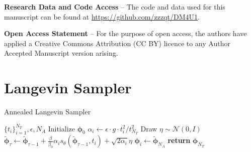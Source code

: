 \documentclass[a4paper,11pt]{article}
\newcommand{\el}{\vspace*{0.2cm}}
\begin{document}
\el\noindent
{\bf Research Data and Code Access} --
The code and data used for this manuscript can be found at \url{https://github.com/zzzqt/DM4U1}.

\el\noindent
{\bf Open Access Statement} -- For the purpose of open access, the authors have applied a Creative Commons Attribution (CC BY) licence to any Author Accepted Manuscript version arising.




\newpage
\appendix


\section{Langevin Sampler}
\label{app:langevin}

\begin{algorithm}[hbtp!]
\caption{Annealed Langevin Sampler}
\label{alg:annealed-langevin}
\begin{algorithmic}[1] 
    \Require $\{t_i\}_{i=1}^{N_T}, \epsilon, N_A$
    \State Initialize ${\mathbf{\phi}}_0$
        \State $\alpha_i \leftarrow \epsilon \cdot g \cdot t_i^2 / t_{N_T}^2$ 
            \State Draw $\eta \sim \mathcal{N}(0, I)$
            \State $\tilde{\mathbf{\phi}}_\tau \leftarrow \tilde{\mathbf{\phi}}_{\tau-1} + \frac{\beta}{\beta_0} \alpha_i s_\theta(\tilde{\mathbf{\phi}}_{\tau-1}, t_i) + \sqrt{2\alpha_i} \eta$
        \EndFor
        \State ${\mathbf{\phi}}_{i} \leftarrow \tilde{\mathbf{\phi}}_{N_A}$
    \EndFor
    \State \textbf{return} ${\mathbf{\phi}}_{N_T}$
\end{algorithmic}
\end{algorithm}
\end{document}
